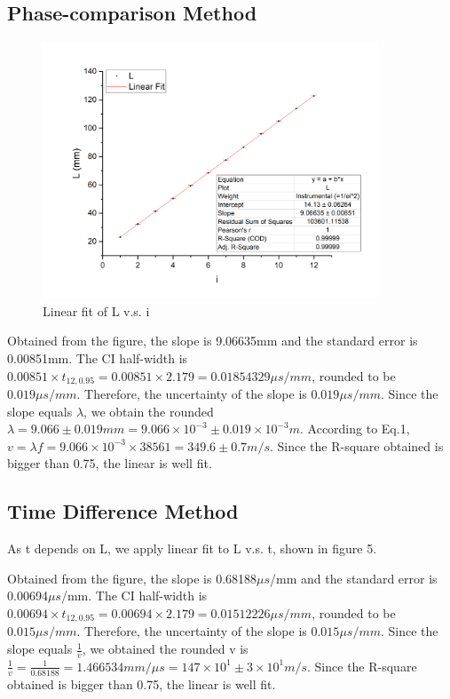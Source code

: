 \documentclass[12pt,a4paper]{article}
\begin{document}
\subsection{Phase-comparison Method}
\begin{figure}[H]
    \centering
    \includegraphics[width=10cm]{method2.png}
    \caption{Linear fit of L v.s. i}
\end{figure} \par
Obtained from the figure, the slope is 9.06635mm and the standard error is 0.00851mm. The CI half-width is $0.00851\times t_{12,0.95}=0.00851\times2.179=0.01854329\mu s/mm$, rounded to be $0.019 \mu s/mm$. Therefore, the uncertainty of the slope is $0.019\mu s /mm$. Since the slope equals $\lambda$, we obtain the rounded $λ=9.066\pm 0.019 mm=9.066\times 10^{-3}\pm 0.019\times 10^{-3} m$.
According to Eq.1, $v=\lambda f=9.066\times 10^{-3}\times 38561=349.6\pm 0.7m/s$. Since the R-square obtained is bigger than 0.75, the linear is well fit.

\subsection{Time Difference Method}
As t depends on L, we apply linear fit to L v.s. t, shown in figure 5.	\par
Obtained from the figure, the slope is 0.68188$\mu s$/mm and the standard error is 0.00694$\mu s$/mm. The CI half-width is $0.00694\times t_{12,0.95}=0.00694\times 2.179=0.01512226\mu s/mm$, rounded to be $0.015\mu s/mm$. Therefore, the uncertainty of the slope is $0.015\mu s/mm$. Since the slope equals $\frac{1}{v}$, we obtained the rounded v is $\frac{1}{v}=\frac{1}{0.68188}=1.466534mm/\mu s=147\times 10^1\pm 3\times 10^1m/s$. Since the R-square obtained is bigger than 0.75, the linear is well fit.
\end{document}
